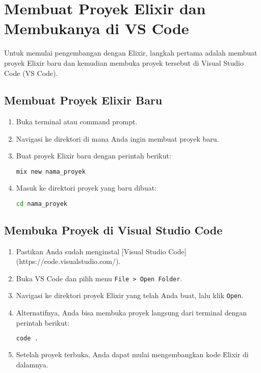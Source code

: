 \section{Membuat Proyek Elixir dan Membukanya di VS Code}

Untuk memulai pengembangan dengan Elixir, langkah pertama adalah membuat proyek Elixir baru dan kemudian membuka proyek tersebut di Visual Studio Code (VS Code).

\subsection{Membuat Proyek Elixir Baru}

\begin{enumerate}
	\item Buka terminal atau command prompt.
	\item Navigasi ke direktori di mana Anda ingin membuat proyek baru.
	\item Buat proyek Elixir baru dengan perintah berikut:
	\begin{lstlisting}[language=bash]
		mix new nama_proyek
	\end{lstlisting}
	\item Masuk ke direktori proyek yang baru dibuat:
	\begin{lstlisting}[language=bash]
		cd nama_proyek
	\end{lstlisting}
\end{enumerate}

\subsection{Membuka Proyek di Visual Studio Code}

\begin{enumerate}
	\item Pastikan Anda sudah menginstal [Visual Studio Code](https://code.visualstudio.com/).
	\item Buka VS Code dan pilih menu \texttt{File > Open Folder}.
	\item Navigasi ke direktori proyek Elixir yang telah Anda buat, lalu klik \texttt{Open}.
	\item Alternatifnya, Anda bisa membuka proyek langsung dari terminal dengan perintah berikut:
	\begin{lstlisting}[language=bash]
		code .
	\end{lstlisting}
	\item Setelah proyek terbuka, Anda dapat mulai mengembangkan kode Elixir di dalamnya.
\end{enumerate}


